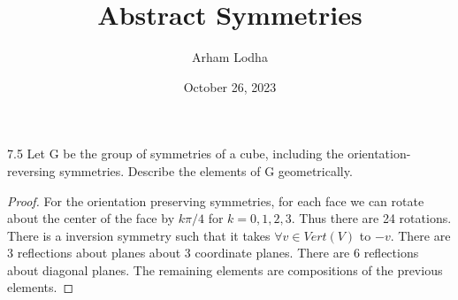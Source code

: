 \documentclass{article}
\begin{document}
\title{Abstract Symmetries}
\author{Arham Lodha}%
\date{October 26, 2023}%
\maketitle

\begin{PROB}{7.5}\label{Problem 7.5.}
    Let G be the group of symmetries of a cube, including the orientation-reversing symmetries. Describe the elements of G geometrically.
\end{PROB}
\begin{proof}
    For the orientation preserving symmetries, for each face we can rotate about the center of the face by $k\pi/4$ for $k = 0, 1, 2, 3$. Thus there are 24 rotations. There is a inversion symmetry such that it takes $\forall v \in Vert(V)$ to $-v$. There are 3 reflections about planes about 3 coordinate planes. There are 6 reflections about diagonal planes. The remaining elements are compositions of the previous elements. 
\end{proof}

\bigskip
\end{document}
